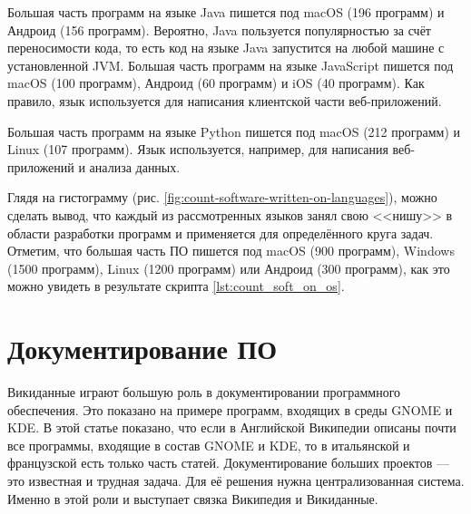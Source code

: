 Большая часть программ на языке Java пишется под macOS (196 программ) и Андроид (156 программ). Вероятно, Java пользуется популярностью за счёт переносимости кода\footnotemark, 
то есть код на языке Java запустится на любой машине с установленной JVM\footnotemark.
\marginnote[0.3cm]{}
Большая часть программ на языке JavaScript пишется под macOS (100 программ), Андроид (60 программ) и iOS (40 программ). Как правило, язык используется для написания клиентской части веб-приложений.

Большая часть программ на языке Python пишется под macOS (212 программ) и Linux (107 программ). Язык используется, например, для написания веб-приложений и анализа данных.

Глядя на гистограмму (рис. \ref{fig:count-software-written-on-languages}), можно сделать вывод, что каждый из рассмотренных языков занял свою <<нишу>> в области разработки программ и применяется для определённого круга задач. Отметим, что большая часть ПО пишется под macOS (900 программ), Windows (1500 программ), Linux (1200 программ) или Андроид (300 программ), как это можно увидеть в результате скрипта \ref{lst:count_soft_on_os}.

\section{Документирование ПО}
Викиданные играют большую роль в документировании программного обеспечения. Это показано на примере программ, входящих в среды GNOME и KDE\cite{documenting_wiki}. В этой статье показано, что если в Английской Википедии описаны почти все программы, входящие в состав GNOME и KDE, то в итальянской и французской есть только часть статей. Документирование больших проектов — это известная и трудная задача. Для её решения нужна централизованная система. Именно в этой роли и выступает связка Википедия и Викиданные\cite{documenting_wiki}.


